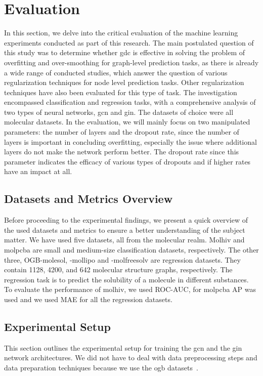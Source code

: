 %
\chapter{Evaluation}
\label{sec:eval}

In this section, we delve into the critical evaluation of the machine learning experiments conducted as part of this research.
The main postulated question of this study was to determine whether \ac{gdc} is effective in solving the problem of overfitting and over-smoothing for graph-level prediction tasks, as there is already a wide range of conducted studies, which answer the question of various regularization techniques for node level prediction tasks. Other regularization techniques have also been evaluated for this type of task.
The investigation encompassed classification and regression tasks, with a comprehensive analysis of two types of neural networks, \ac{gcn} and \ac{gin}.
The datasets of choice were all molecular datasets.
In the evaluation, we will mainly focus on two manipulated parameters: the number of layers and the dropout rate, since the number of layers is important in concluding overfitting, especially the issue where additional layers do not make the network perform better. The dropout rate since this parameter indicates the efficacy of various types of dropouts and if higher rates have an impact at all.


\section{Datasets and Metrics Overview}
\label{sec:eval:overvies}

Before proceeding to the experimental findings, we present a quick overview of the used datasets and metrics to ensure a better understanding of the subject matter. We have used five datasets, all from the molecular realm. Molhiv and molpcba are small and medium-size classification datasets, respectively.
The other three, OGB-molesol, -mollipo and -molfreesolv are regression datasets. They contain 1128, 4200, and 642
molecular structure graphs, respectively. The regression task is to predict the solubility
of a molecule in different substances.
To evaluate the performance of molhiv, we used ROC-AUC, for molpcba AP was used and we used MAE for all the regression datasets.

\section{Experimental Setup}
\label{sec:eval:setup}
This section outlines the experimental setup for training the \ac{gcn} and the \ac{gin} network architectures.
We did not have to deal with data preprocessing steps and data preparation techniques because we use the \ac{ogb} datasets~\cite{Hu2020}.

